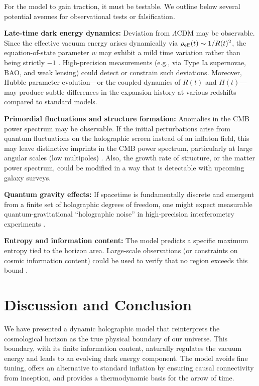 \documentclass[12pt]{article}
\begin{document}
For the model to gain traction, it must be testable. We outline below several potential avenues for observational tests or falsification.

\textbf{Late-time dark energy dynamics:} Deviation from $\Lambda$CDM may be observable. Since the effective vacuum energy arises dynamically via $\rho_{\rm eff}(t) \sim 1/R(t)^2$, the equation-of-state parameter $w$ may exhibit a mild time variation rather than being strictly $-1$ \cite{Riess1998}. High-precision measurements (e.g., via Type Ia supernovae, BAO, and weak lensing) could detect or constrain such deviations.
Moreover, Hubble parameter evolution---or the coupled dynamics of $R(t)$ and $H(t)$---may produce subtle differences in the expansion history at various redshifts compared to standard models.

\textbf{Primordial fluctuations and structure formation:} Anomalies in the CMB power spectrum may be observable. If the initial perturbations arise from quantum fluctuations on the holographic screen instead of an inflaton field, this may leave distinctive imprints in the CMB power spectrum, particularly at large angular scales (low multipoles) \cite{Liddle2000}.
Also, the growth rate of structure, or the matter power spectrum, could be modified in a way that is detectable with upcoming galaxy surveys.

\textbf{Quantum gravity effects:} If spacetime is fundamentally discrete and emergent from a finite set of holographic degrees of freedom, one might expect measurable quantum-gravitational ``holographic noise'' in high-precision interferometry experiments \cite{Hogan_2008}.

\textbf{Entropy and information content:} The model predicts a specific maximum entropy tied to the horizon area. Large-scale observations (or constraints on cosmic information content) could be used to verify that no region exceeds this bound \cite{Bekenstein1975,Hawking1976}.

\section{Discussion and Conclusion}
We have presented a dynamic holographic model that reinterprets the cosmological horizon as the true physical boundary of our universe. This boundary, with its finite information content, naturally regulates the vacuum energy and leads to an evolving dark energy component. The model avoids fine tuning, offers an alternative to standard inflation \cite{Liddle2000} by ensuring causal connectivity from inception, and provides a thermodynamic basis for the arrow of time.
\end{document}
